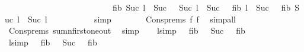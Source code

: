 \begin{isabellebody}
\ \ \ \ \ \ \ \ \ \ \ \ \ \ \ \ \ \ \ \ \ \ \ \ \ \ {\isachardoublequoteopen}{\isacharparenleft}fib{}\ {\isacharparenleft}Suc\ {\isacharparenleft}l\ {\isacharminus}\ Suc\ {}{\isacharparenright}{\isacharparenright}\ {\isacharminus}\ Suc\ {\isacharparenleft}l\ {\isacharminus}\ Suc\ {}{\isacharparenright}{\isacharparenright}\ {\isacharplus}\ fib{}\ {\isacharparenleft}l\ {\isacharminus}\ Suc\ {}{\isacharparenright}\ {\isacharequal}\ {\isacharparenleft}fib{}\ {\isacharparenleft}Suc\ l{\isacharparenright}\ {\isacharminus}\ Suc\ l{\isacharparenright}{\isachardoublequoteclose}{\isacharparenright}\isanewline
\ \ \ \ \ \ \ \ \ \isamarkupfalse%
\ simp\isanewline
\ \ \ \ \ \ \isamarkupfalse%
\ Cons{\isachardot}prems{\isacharparenleft}{}{\isacharparenright}\ f{}\ f{}\ \isamarkupfalse%
\ simp{\isacharunderscore}all\isanewline
\ \ \ \ \ \ \isamarkupfalse%
\ Cons{\isachardot}prems\ sumn{\isacharunderscore}first{\isacharunderscore}one{\isacharunderscore}out\ \isamarkupfalse%
\ simp\isanewline
\ \ \isamarkupfalse%
\isanewline
{}\isamarkupfalse%
%
\endisatagproof
{\isafoldproof}%
%
\isadelimproof
\isanewline
%
\endisadelimproof
\isanewline
{}\isamarkupfalse%
\ l{}{}{}{\isacharbrackleft}simp{\isacharbrackright}{\isacharcolon}\ {\isachardoublequoteopen}{}{}\ {\isacharasterisk}\ {\isacharparenleft}fib\ {}\ {\isacharminus}\ Suc\ {}{\isacharparenright}\ {\isacharplus}\ {\isacharparenleft}fib{}\ {}\ {\isacharminus}\ {}{\isacharparenright}\ {\isacharequal}\ {}{}{}{\isachardoublequoteclose}\isanewline
%
\isadelimproof
\ \ %
\endisadelimproof
%
\isatagproof
{}\isamarkupfalse%
%
\endisatagproof
{\isafoldproof}%
%
\isadelimproof
\isanewline
%
\endisadelimproof
{}\isamarkupfalse%
\ l{}{}{}{}{\isacharbrackleft}simp{\isacharbrackright}{\isacharcolon}\ {\isachardoublequoteopen}{}{}\ {\isacharasterisk}\ {\isacharparenleft}fib\ {}{}\ {\isacharminus}\ Suc\ {}{\isacharparenright}\ {\isacharplus}\ {\isacharparenleft}fib{}\ {}{}\ {\isacharminus}\ {}{}{\isacharparenright}\ {\isacharequal}\ {}{}{}{}{\isachardoublequoteclose}\isanewline

\end{isabellebody}
